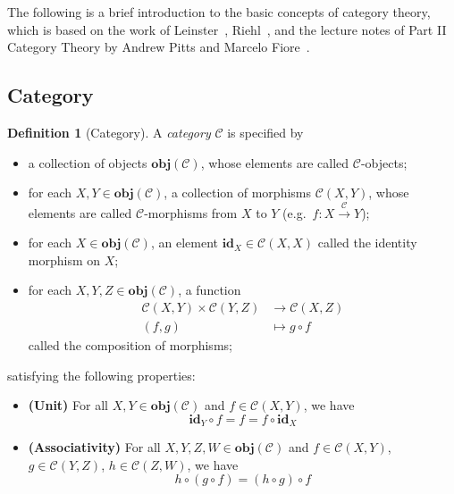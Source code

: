 \documentclass[12pt,a4paper]{report}
\theoremstyle{definition}
\newtheorem{definition}{Definition}[chapter]
\begin{document}
        The following is a brief introduction to the basic concepts of category theory, which is based on the work of Leinster~\autocite{basic_cat}, 
        Riehl~\autocite{cat_context}, and the lecture notes of Part II Category Theory by Andrew Pitts and Marcelo Fiore~\autocite{cat_lecture_notes}.

        \subsection{Category}
        \begin{definition}[Category] \label{def: category}
            A \emph{category} $\mathcal{C}$ is specified by
            \begin{itemize}
                \item 
                    a collection of objects $\textbf{obj}(\mathcal{C})$, whose elements are called $\mathcal{C}$-objects;
                \item 
                    for each $X, Y \in \textbf{obj}(\mathcal{C})$, a collection of morphisms $\mathcal{C}{(X,Y)}$, whose elements are called $\mathcal{C}$-morphisms from $X$ to $Y$ (e.g.\ $f : X \xrightarrow{\mathcal{C}} Y$);
                \item 
                    for each $X \in \textbf{obj}(\mathcal{C})$, an element $\textbf{id}_X \in \mathcal{C}{(X,X)}$ called the identity morphism on $X$;
                \item 
                    for each $X, Y, Z \in \textbf{obj}(\mathcal{C})$, a function 
                    \[\begin{aligned}
                        \mathcal{C}{(X,Y)} \times \mathcal{C}{(Y,Z)} &\to \mathcal{C}{(X,Z)} \\
                        (f,g) &\mapsto g \circ f
                    \end{aligned}\]
                    called the composition of morphisms;
            \end{itemize}
            satisfying the following properties:
            \begin{itemize}
                \item 
                    \textbf{(Unit)}
                    For all $X, Y \in \textbf{obj}(\mathcal{C})$ and $f \in \mathcal{C}{(X,Y)}$, we have
                    \begin{equation} \label{law: unit}
                        \textbf{id}_Y \circ f = f = f \circ \textbf{id}_X
                    \end{equation}
                \item
                    \textbf{(Associativity)}
                    For all $X, Y, Z, W \in \textbf{obj}(\mathcal{C})$ and $f \in \mathcal{C}{(X,Y)}$, $g \in \mathcal{C}{(Y,Z)}$, $h \in \mathcal{C}{(Z,W)}$, we have
                    \begin{equation} \label{law: associativity}
                        h \circ (g \circ f) = (h \circ g) \circ f
                    \end{equation}
            \end{itemize}
        \end{definition}
\end{document}
